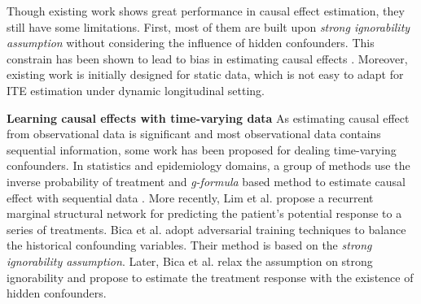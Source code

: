 Though existing work shows great performance in causal effect estimation, they still have some limitations. First, most of them are built upon \textit{strong ignorability assumption} without considering the influence of hidden confounders. This constrain has been shown to lead to bias in estimating causal effects \cite{pearl2009causality}. Moreover, existing work is initially designed for static data, which is not easy to adapt for ITE estimation under dynamic longitudinal setting. 

\vspace{3pt}
\noindent\textbf{Learning causal effects with time-varying data}
As estimating causal effect from observational data is significant and most observational data contains sequential information, some work has been proposed for dealing time-varying confounders. In statistics and epidemiology domains, a group of methods use the inverse probability of treatment and \textit{g-formula} based method to estimate causal effect with sequential data \cite{robins2000marginal,schulam2017reliable}. More recently, Lim et al. \cite{lim2018forecasting} propose a recurrent marginal structural network for predicting the patient's potential response to a series of treatments. Bica et al. \cite{bica2020estimating} adopt adversarial training techniques to balance the historical confounding variables. Their method is based on the \textit{strong ignorability assumption}. Later, Bica et al. \cite{bica2019time} relax the assumption on strong ignorability and propose to estimate the treatment response with the existence of hidden confounders. 